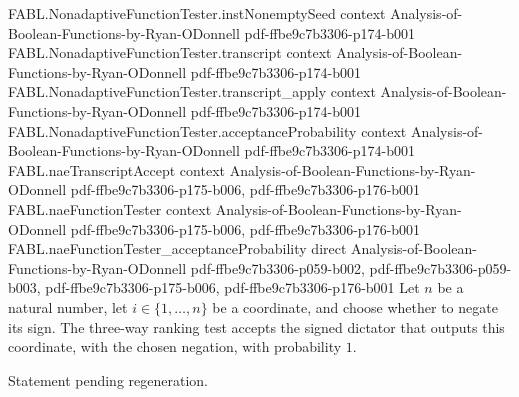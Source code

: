 \begin{theorem}
\proofstep
  {FABL.NonadaptiveFunctionTester.instNonemptySeed}
  {context}
  {Analysis-of-Boolean-Functions-by-Ryan-ODonnell}
  {pdf-ffbe9c7b3306-p174-b001}
\proofstep
  {FABL.NonadaptiveFunctionTester.transcript}
  {context}
  {Analysis-of-Boolean-Functions-by-Ryan-ODonnell}
  {pdf-ffbe9c7b3306-p174-b001}
\proofstep
  {FABL.NonadaptiveFunctionTester.transcript_apply}
  {context}
  {Analysis-of-Boolean-Functions-by-Ryan-ODonnell}
  {pdf-ffbe9c7b3306-p174-b001}
\proofstep
  {FABL.NonadaptiveFunctionTester.acceptanceProbability}
  {context}
  {Analysis-of-Boolean-Functions-by-Ryan-ODonnell}
  {pdf-ffbe9c7b3306-p174-b001}
\proofstep
  {FABL.naeTranscriptAccept}
  {context}
  {Analysis-of-Boolean-Functions-by-Ryan-ODonnell}
  {pdf-ffbe9c7b3306-p175-b006,
    pdf-ffbe9c7b3306-p176-b001}
\proofstep
  {FABL.naeFunctionTester}
  {context}
  {Analysis-of-Boolean-Functions-by-Ryan-ODonnell}
  {pdf-ffbe9c7b3306-p175-b006,
    pdf-ffbe9c7b3306-p176-b001}
\proofstep
  {FABL.naeFunctionTester_acceptanceProbability}
  {direct}
  {Analysis-of-Boolean-Functions-by-Ryan-ODonnell}
  {pdf-ffbe9c7b3306-p059-b002,
    pdf-ffbe9c7b3306-p059-b003,
    pdf-ffbe9c7b3306-p175-b006,
    pdf-ffbe9c7b3306-p176-b001}
Let $n$ be a natural number, let $i\in\{1,\ldots,n\}$ be a coordinate, and choose
whether to negate its sign. The three-way ranking test accepts the signed dictator that
outputs this coordinate, with the chosen negation, with probability $1$.
\end{theorem}

\begin{theorem}
\label{FABL.naeTest_levelOneWeight_ge}
\leanok
{}
Statement pending regeneration.
\end{theorem}

